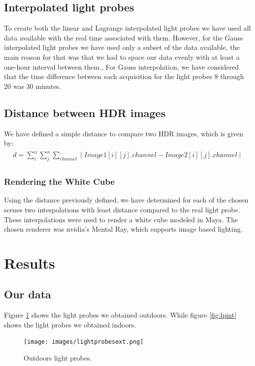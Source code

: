 \documentclass[conference]{acmsiggraph}
\begin{document}
\subsection{Interpolated light probes}
	To create both the linear and Lagrange interpolated light probes we have used all data available with the real time associated with them. 
However, for the Gauss interpolated light probes we have used only a subset of the data available, the main reason for that was that we had to space our data evenly with at least a one-hour interval between them., For Gauss interpolation, we have considered that the time difference between each acquisition for the light probes 8 through 20 was 30 minutes.

\subsection{Distance between HDR images}
	We have defined a simple distance to compare two HDR images, which is given by:
\begin{align}
\begin{split}
	d = \sum\limits_{i}^{n} \sum\limits_{j}^{n} \sum\limits_{channel} \mid Image1[i][j].channel - Image2[i][j].channel \mid
\end{split}
\end{align}

\subsubsection{Rendering the White Cube}
	Using the distance previously defined, we have determined for each of the chosen scenes two interpolations with least distance compared to the real light probe. These interpolations were used to render a white cube modeled in Maya. The chosen renderer was nvidia’s Mental Ray, which supports image based lighting.

\section{Results}

\subsection{Our data}
	Figure  \ref{fig:lpext} shows the light probes we obtained outdoors. While figure  \ref{fig:lpint} shows the light probes we obtained indoors.


	\begin{figure}[!ht]
		\caption{Outdoors light probes.}
		\centering
		\texttt{[image: images/lightprobesext.png]}
		\label{fig:lpext}
	\end{figure}
\end{document}
